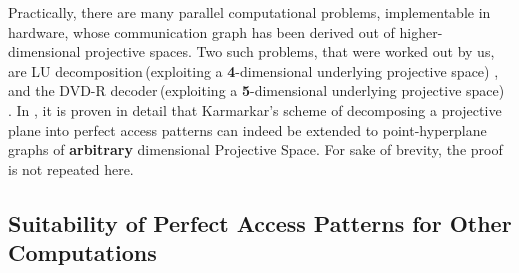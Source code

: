 \documentclass[12pt]{article}
\begin{document}
Practically, there are many parallel computational
problems, implementable in hardware, whose communication graph has been
derived out of higher-dimensional projective spaces. Two such problems,
that were worked out by us, are LU decomposition\,(exploiting a
\textbf{4}-dimensional underlying projective space) \cite{mat_pap}, and the
DVD-R decoder\,(exploiting a \textbf{5}-dimensional underlying projective
space) \cite{expanders}. In \cite{fold2_techrep}, it is proven in detail
that Karmarkar's scheme of decomposing a projective plane into perfect
access patterns can indeed be extended to point-hyperplane graphs of
\textbf{arbitrary} dimensional Projective Space. For sake of brevity, the
proof is not repeated here.

\subsection{Suitability of Perfect Access Patterns for Other Computations}
\label{non_simd_pap_sec}
\end{document}
